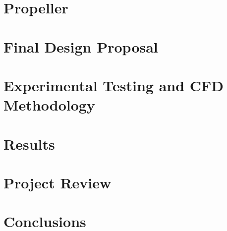 \documentclass{article}
\begin{document}
\section{Propeller}


\section{Final Design Proposal}


\section{Experimental Testing and CFD Methodology}


\section{Results}


\section{Project Review}


\section{Conclusions}






%

%

%




%     
\end{document}
